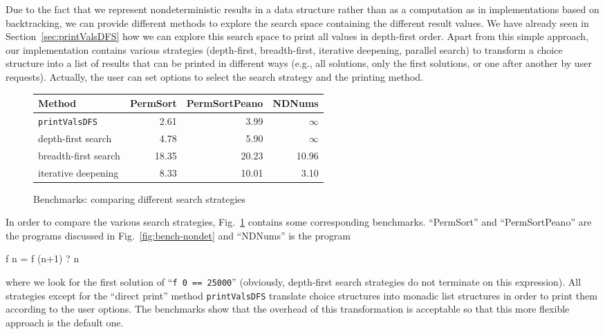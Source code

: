 \documentclass{llncs}
\newcommand{\code}[1]{\mbox{\small\texttt{#1}}}
\newcommand{\ccode}[1]{``\code{#1}''}
\begin{document}
Due to the fact that we represent nondeterministic results
in a data structure rather than as a computation as in implementations
based on backtracking, we can provide different methods to
explore the search space containing the different result values.
We have already seen in Section~\ref{sec:printValsDFS}
how we can explore this search space to print all values in
depth-first order.
Apart from this simple approach,
our implementation contains various strategies
(depth-first, breadth-first, iterative deepening, parallel search)
to transform a choice structure into a list of results
that can be printed in different ways (e.g., all solutions, only the first
solutions, or one after another by user requests).
Actually, the user can set options to select the search strategy and
the printing method.

\begin{figure}
\centering
\begin{tabular}{|@{~~}l@{~~}|*{3}{@{~~}r@{~~}|}}
\hline
Method               & PermSort & PermSortPeano &  NDNums \\\hline
\code{printValsDFS}  &    2.61  &         3.99  & $\infty$ \\
depth-first search   &    4.78  &         5.90  & $\infty$ \\
breadth-first search &   18.35  &        20.23  &    10.96 \\
iterative deepening  &    8.33  &        10.01  &     3.10 \\
\hline
\end{tabular}
\caption{Benchmarks: comparing different search strategies}
 \label{fig:search-strategies}
\end{figure}
%
In order to compare the various search strategies,
Fig.~\ref{fig:search-strategies} contains some corresponding
benchmarks.
``PermSort'' and ``PermSortPeano'' are the programs
discussed in Fig.~\ref{fig:bench-nondet} and ``NDNums'' is the program
\begin{curry}
  f n = f (n+1) ? n
\end{curry}
where we look for the first solution of \ccode{f 0 == 25000}
(obviously, depth-first search strategies do not terminate on this
expression).
All strategies except for the ``direct print'' method \code{printValsDFS}
translate choice structures into monadic list structures
in order to print them according to the user options.
The benchmarks show that the overhead of this transformation
is acceptable so that this more flexible approach is the default one.
\end{document}
